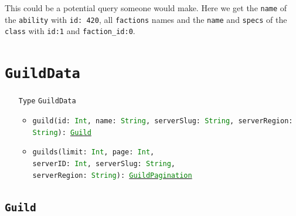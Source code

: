 \documentclass[10pt, a4paper]{memoir}
\numberwithin{equation}{section}
\theoremstyle{plain}
\theoremstyle{defp}
\theoremstyle{dotless}
\theoremstyle{definition}
\theoremstyle{dotless}
\theoremstyle{dotless}
\theoremstyle{defp}
\theoremstyle{defp}
\theoremstyle{be}          %
\theoremstyle{defp}
\newcommand\ttt[1]{\texttt{#1}}
\newcommand\type[1]{\ttt{\textcolor{green}{#1}}}
\begin{document}
This could be a potential query someone would make. Here we get the \ttt{name} of the \ttt{ability} with \ttt{id: 420}, all \ttt{factions} names and the \ttt{name} and \ttt{specs} of the \ttt{class} with \ttt{id:1} and \ttt{faction\_id:0}.
\newpage



\section{\ttt{GuildData}}\label{sec:GuildData}

\begin{itemize}[noitemsep,topsep=1pt]
\item[\ttt{Type}] \ttt{GuildData}
\begin{itemize}[itemsep=1pt,topsep=1pt]
\item \ttt{guild(id: \type{Int}, name: \type{String}, serverSlug: \type{String}, serverRegion: \type{String}): \hyperref[sec:Guild]{\type{Guild}}}
\item \ttt{guilds(limit: \type{Int}, page: \type{Int}, \\serverID: \type{Int}, serverSlug: \type{String}, \\serverRegion: \type{String}): \hyperref[sec:guildpagination]{\type{GuildPagination}}}
\end{itemize}
\end{itemize}

\subsection{\ttt{Guild}}\label{sec:Guild}
\end{document}
